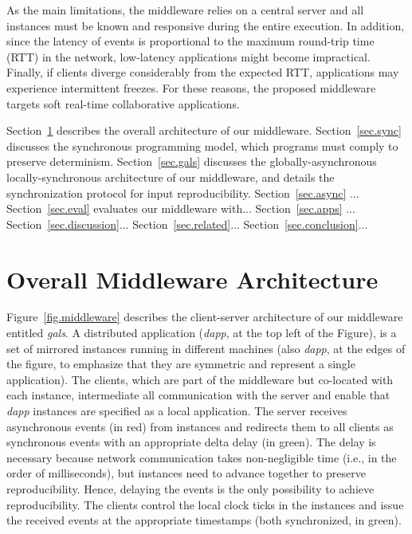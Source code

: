 \documentclass[sigplan,screen]{acmart}
\newcommand{\dapp}{\emph{dapp}\xspace}
\begin{document}
As the main limitations, the middleware relies on a central server and all
instances must be known and responsive during the entire execution.
In addition, since the latency of events is proportional to the maximum
round-trip time (RTT) in the network, low-latency applications might become
impractical.
Finally, if clients diverge considerably from the expected RTT, applications
may experience intermittent freezes.
For these reasons, the proposed middleware targets soft real-time collaborative
applications.

Section~\ref{sec.arch} describes the overall architecture of our middleware.
Section~\ref{sec.sync} discusses the synchronous programming model, which
programs must comply to preserve determinism.
Section~\ref{sec.gals} discusses the globally-asynchronous locally-synchronous
architecture of our middleware, and details the synchronization protocol for
input reproducibility.
Section~\ref{sec.async} ...
Section~\ref{sec.eval} evaluates our middleware with...
Section~\ref{sec.apps} ... %
Section~\ref{sec.discussion}...
Section~\ref{sec.related}...
Section~\ref{sec.conclusion}...

\section{Overall Middleware Architecture}
\label{sec.arch}

Figure~\ref{fig.middleware} describes the client-server architecture of our
middleware entitled \emph{gals}.
A distributed application (\dapp, at the top left of the Figure), is a set of
mirrored instances running in different machines (also \dapp, at the edges of
the figure, to emphasize that they are symmetric and represent a single
application).
The clients, which are part of the middleware but co-located with each
instance, intermediate all communication with the server and enable that \dapp
instances are specified as a local application.
The server receives asynchronous events (in red) from instances and redirects
them to all clients as synchronous events with an appropriate delta delay (in
green).
The delay is necessary because network communication takes non-negligible time
(i.e., in the order of milliseconds), but instances need to advance together
to preserve reproducibility.
Hence, delaying the events is the only possibility to achieve reproducibility.
The clients control the local clock ticks in the instances and issue the
received events at the appropriate timestamps (both synchronized, in green).
\end{document}

